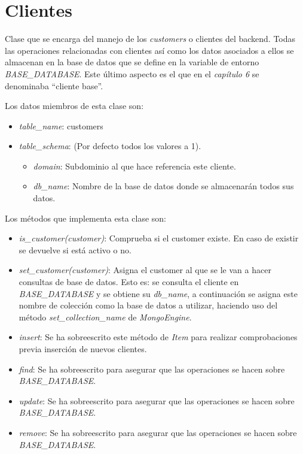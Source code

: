 \section{Clientes}

Clase que se encarga del manejo de los \textit{customers} o clientes del backend. Todas las operaciones relacionadas con clientes así como los datos asociados a ellos se almacenan en la base de datos que se define en la variable de entorno \textit{BASE\_DATABASE}. Este último aspecto es el que en el \textit{capítulo 6} se denominaba ``cliente base''.

\bigskip
Los datos miembros de esta clase son:
\begin{itemize}
	\item \textit{table\_name}: customers
	\item \textit{table\_schema}: (Por defecto todos los valores a 1).
	\begin{itemize}
		\item \textit{domain}: Subdominio al que hace referencia este cliente.
		\item \textit{db\_name}: Nombre de la base de datos donde se almacenarán todos sus datos.
	\end{itemize}
\end{itemize}


\bigskip
Los métodos que implementa esta clase son:
\begin{itemize}
	\item \textit{is\_customer(customer)}: Comprueba si el customer existe. En caso de existir se devuelve si está activo o no.
	\item \textit{set\_customer(customer)}: Asigna el customer al que se le van a hacer consultas de base de datos. Esto es: se consulta el cliente en \textit{BASE\_DATABASE} y se obtiene su \textit{db\_name}, a continuación se asigna este nombre de colección como la base de datos a utilizar, haciendo uso del método \textit{set\_collection\_name} de \textit{MongoEngine}.
	\item \textit{insert}: Se ha sobreescrito este método de \textit{Item} para realizar comprobaciones previa inserción de nuevos clientes.
	\item \textit{find}: Se ha sobreescrito para asegurar que las operaciones se hacen sobre \textit{BASE\_DATABASE}.
	\item \textit{update}: Se ha sobreescrito para asegurar que las operaciones se hacen sobre \textit{BASE\_DATABASE}.
	\item \textit{remove}: Se ha sobreescrito para asegurar que las operaciones se hacen sobre \textit{BASE\_DATABASE}.
\end{itemize}


